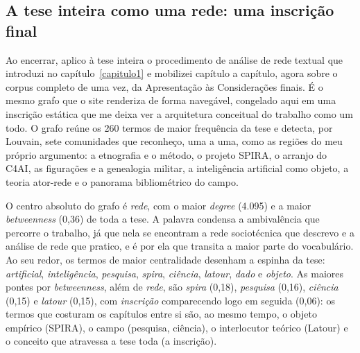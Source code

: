 %
%

\subsection*{A tese inteira como uma rede: uma inscrição final}

Ao encerrar, aplico à tese inteira o procedimento de análise de rede
textual que introduzi no capítulo~\ref{capitulo1} e mobilizei capítulo a
capítulo, agora sobre o corpus completo de uma vez, da Apresentação às
Considerações finais. É o mesmo grafo que o site renderiza de forma
navegável, congelado aqui em uma inscrição estática que me deixa ver a
arquitetura conceitual do trabalho como um todo. O grafo reúne os 260
termos de maior frequência da tese e detecta, por Louvain, sete
comunidades que reconheço, uma a uma, como as regiões do meu próprio
argumento: a etnografia e o método, o projeto SPIRA, o arranjo do C4AI, as
figurações e a genealogia militar, a inteligência artificial como objeto,
a teoria ator-rede e o panorama bibliométrico do campo.

O centro absoluto do grafo é \textit{rede}, com o maior \textit{degree}
(4.095) e a maior \textit{betweenness} (0,36) de toda a tese. A palavra
condensa a ambivalência que percorre o trabalho, já que nela se encontram
a rede sociotécnica que descrevo e a análise de rede que pratico, e é por
ela que transita a maior parte do vocabulário. Ao seu redor, os termos de
maior centralidade desenham a espinha da tese: \textit{artificial},
\textit{inteligência}, \textit{pesquisa}, \textit{spira}, \textit{ciência},
\textit{latour}, \textit{dado} e \textit{objeto}. As maiores pontes por
\textit{betweenness}, além de \textit{rede}, são \textit{spira} (0,18),
\textit{pesquisa} (0,16), \textit{ciência} (0,15) e \textit{latour}
(0,15), com \textit{inscrição} comparecendo logo em seguida (0,06): os
termos que costuram os capítulos entre si são, ao mesmo tempo, o objeto
empírico (SPIRA), o campo (pesquisa, ciência), o interlocutor teórico
(Latour) e o conceito que atravessa a tese toda (a inscrição).

